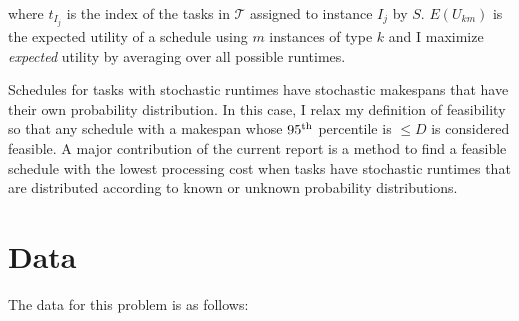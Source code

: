 \documentclass[12pt]{report}
\begin{document}
where $t_{I_j}$ is the index of the tasks in $\mathcal{T}$ assigned to instance $I_j$ by $S$. $E(U_{km})$ is the expected utility of a schedule using $m$ instances of type $k$ and I maximize \textit{expected} utility by averaging over all possible runtimes.

Schedules for tasks with stochastic runtimes have stochastic makespans that have their own probability distribution. 
In this case, I relax my definition of feasibility so that any schedule with a makespan whose $95\textsuperscript{th}$ percentile is $\le D$ is considered feasible. 
A major contribution of the current report is a method to find a feasible schedule with the lowest processing cost when tasks have stochastic runtimes that are distributed according to known or unknown probability distributions.

\section{Data}

\label{Data}
The data for this problem is as follows:
\end{document}
